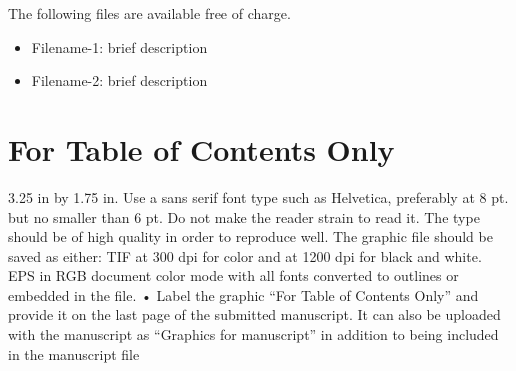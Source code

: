 \documentclass[letterpaper]{article}
\begin{document}
The following files are available free of charge.
\begin{itemize}
  \item Filename-1: brief description
  \item Filename-2: brief description
\end{itemize}

\printbibliography

\newpage

\section*{For Table of Contents Only}
3.25 in by 1.75 in. Use a sans serif font type such as Helvetica, preferably at 8 pt. but no smaller than 6 pt. Do not make the reader strain to read it. The type should be of high quality in order to reproduce well. The graphic file should be saved as either:
TIF at 300 dpi for color and at 1200 dpi for black and white.
EPS in RGB document color mode with all fonts converted to outlines or embedded in the file.
• Label the graphic “For Table of Contents Only” and provide it on the last page of the submitted
manuscript. It can also be uploaded with the manuscript as “Graphics for manuscript” in
addition to being included in the manuscript file
\end{document}
